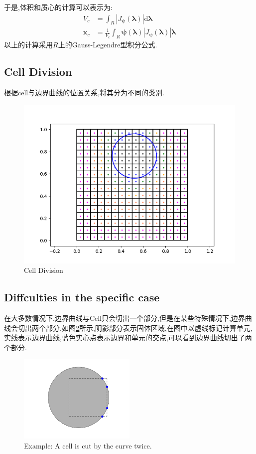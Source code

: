 \documentclass[12pt,halfline,a4paper]{ouparticle}
\begin{document}
\newline 
于是,体积和质心的计算可以表示为:
\begin{equation}\label{eq:volume_centorid}
\begin{aligned}
    V_{c} &= \int_{R} |J_{\boldsymbol{\psi}}(\boldsymbol{\lambda})| \mathrm{d} \boldsymbol{\lambda}\\
    \boldsymbol{x}_{c} &= \frac{1}{V_{c}} \int_{R} \boldsymbol{\psi}(\boldsymbol{\lambda}) |J_{\boldsymbol{\psi}}(\boldsymbol{\lambda})|\boldsymbol{\lambda}
\end{aligned}
\end{equation}
以上的计算采用$R$上的Gauss-Legendre型积分公式.

\subsection{Cell Division}
根据cell与边界曲线的位置关系,将其分为不同的类别.
\begin{figure}[h]
    \centering
    \includegraphics{figure/cycle.png}
    \caption{Cell Division}
    \label{fig:cell_division}
\end{figure}


\subsection{Diffculties in the specific case}
在大多数情况下,边界曲线与Cell只会切出一个部分,但是在某些特殊情况下,边界曲线会切出两个部分,如图\ref{fig:cut_cell_example}所示,阴影部分表示固体区域,在图中以虚线标记计算单元,实线表示边界曲线,蓝色实心点表示边界和单元的交点,可以看到边界曲线切出了两个部分.



\begin{figure}[h]
    \centering
    \includegraphics[width=0.5\textwidth]{figure/cut_cell_example.png}
    \caption{Example: A cell is cut by the curve twice.}
    \label{fig:cut_cell_example}
\end{figure}






\newpage


\end{document}
